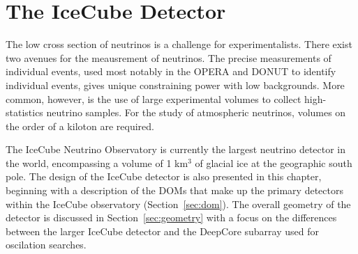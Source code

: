 \chapter{The IceCube Detector}
The low cross section of neutrinos is a challenge for experimentalists.
There exist two avenues for the meausrement of neutrinos.
The precise measurements of individual events, used most notably in the OPERA \cite{Description-OPERA} and DONUT \cite{Description-DONUT} to identify individual events, gives unique constraining power with low backgrounds.
More common, however, is the use of large experimental volumes to collect high-statistics neutrino samples.
For the study of atmospheric neutrinos, volumes on the order of a kiloton are required. 

The IceCube Neutrino Observatory is currently the largest neutrino detector in the world, encompassing a volume of 1 km$^3$ of glacial ice at the geographic south pole.
The design of the IceCube detector is also presented in this chapter, beginning with a description of the DOMs that make up the primary detectors within the IceCube observatory (Section~\ref{sec:dom}).
The overall geometry of the detector is discussed in Section~\ref{sec:geometry} with a focus on the differences between the larger IceCube detector and the DeepCore subarray used for oscilation searches.

\label{sec:dom}


\label{sec:geometry}


\label{sec:ice}


